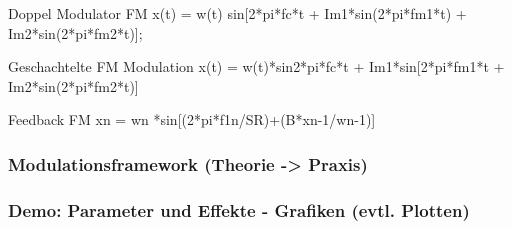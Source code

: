 Doppel Modulator FM
x(t) = w(t) sin[2*pi*fc*t + Im1*sin(2*pi*fm1*t) + Im2*sin(2*pi*fm2*t)];

Geschachtelte FM Modulation
x(t) = w(t)*sin{2*pi*fc*t + Im1*sin[2*pi*fm1*t + Im2*sin(2*pi*fm2*t)]}

Feedback FM 
xn = wn *sin[(2*pi*f1n/SR)+(B*xn-1/wn-1)]


\subsubsection{Modulationsframework (Theorie -> Praxis)}
\subsubsection{Demo: Parameter und Effekte - Grafiken (evtl. Plotten)}